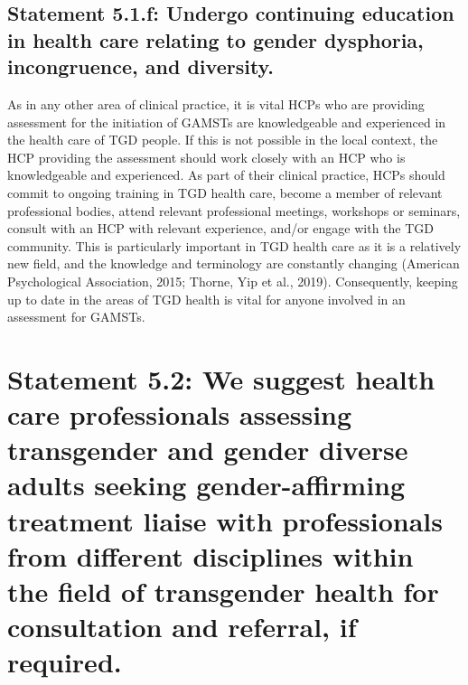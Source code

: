 \documentclass[
]{book}
\begin{document}
\hypertarget{statement-5.1.f-undergo-continuing-education-in-health-care-relating-to-gender-dysphoria-incongruence-and-diversity.}{%
\subsection*{Statement 5.1.f: Undergo continuing education in health care relating to gender dysphoria, incongruence, and diversity.}\label{statement-5.1.f-undergo-continuing-education-in-health-care-relating-to-gender-dysphoria-incongruence-and-diversity.}}

As in any other area of clinical practice, it is vital
HCPs who are providing assessment for the initiation
of GAMSTs are knowledgeable and experienced in
the health care of TGD people. If this is not possible
in the local context, the HCP providing the assessment should work closely with an HCP who is
knowledgeable and experienced. As part of their
clinical practice, HCPs should commit to ongoing
training in TGD health care, become a member of
relevant professional bodies, attend relevant professional meetings, workshops or seminars, consult with
an HCP with relevant experience, and/or engage with
the TGD community. This is particularly important
in TGD health care as it is a relatively new field,
and the knowledge and terminology are constantly
changing (American Psychological Association, 2015;
Thorne, Yip et al., 2019). Consequently, keeping up
to date in the areas of TGD health is vital for anyone
involved in an assessment for GAMSTs.

\hypertarget{statement-5.2-we-suggest-health-care-professionals-assessing-transgender-and-gender-diverse-adults-seeking-gender-affirming-treatment-liaise-with-professionals-from-different-disciplines-within-the-field-of-transgender-health-for-consultation-and-referral-if-required.}{%
\section*{Statement 5.2: We suggest health care professionals assessing transgender and gender diverse adults seeking gender-affirming treatment liaise with professionals from different disciplines within the field of transgender health for consultation and referral, if required.}\label{statement-5.2-we-suggest-health-care-professionals-assessing-transgender-and-gender-diverse-adults-seeking-gender-affirming-treatment-liaise-with-professionals-from-different-disciplines-within-the-field-of-transgender-health-for-consultation-and-referral-if-required.}}
\end{document}

